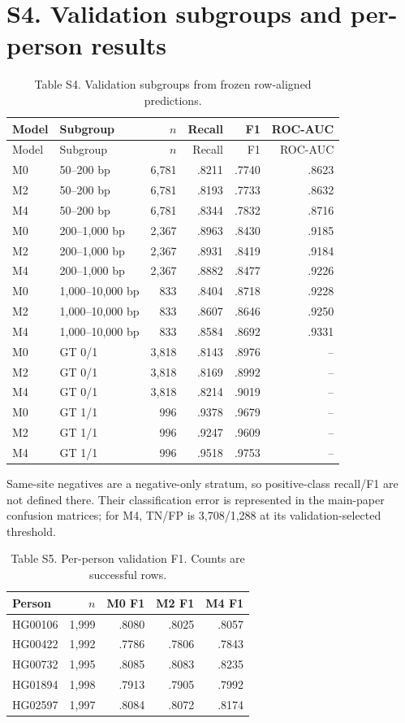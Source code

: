 \documentclass[10pt]{article}
\begin{document}
\section*{S4. Validation subgroups and per-person results}
\begin{longtable}{llrrrr}
\caption{Table S4. Validation subgroups from frozen row-aligned predictions.}\label{tab:s4subgroups}\\
\toprule Model & Subgroup & $n$ & Recall & F1 & ROC-AUC\\\midrule\endfirsthead
\toprule Model & Subgroup & $n$ & Recall & F1 & ROC-AUC\\\midrule\endhead
\bottomrule\endfoot
M0 & 50--200 bp & 6,781 & .8211 & .7740 & .8623\\
M2 & 50--200 bp & 6,781 & .8193 & .7733 & .8632\\
M4 & 50--200 bp & 6,781 & .8344 & .7832 & .8716\\
M0 & 200--1,000 bp & 2,367 & .8963 & .8430 & .9185\\
M2 & 200--1,000 bp & 2,367 & .8931 & .8419 & .9184\\
M4 & 200--1,000 bp & 2,367 & .8882 & .8477 & .9226\\
M0 & 1,000--10,000 bp & 833 & .8404 & .8718 & .9228\\
M2 & 1,000--10,000 bp & 833 & .8607 & .8646 & .9250\\
M4 & 1,000--10,000 bp & 833 & .8584 & .8692 & .9331\\
M0 & GT 0/1 & 3,818 & .8143 & .8976 & --\\
M2 & GT 0/1 & 3,818 & .8169 & .8992 & --\\
M4 & GT 0/1 & 3,818 & .8214 & .9019 & --\\
M0 & GT 1/1 & 996 & .9378 & .9679 & --\\
M2 & GT 1/1 & 996 & .9247 & .9609 & --\\
M4 & GT 1/1 & 996 & .9518 & .9753 & --\\
\end{longtable}
Same-site negatives are a negative-only stratum, so positive-class recall/F1 are not defined there. Their classification error is represented in the main-paper confusion matrices; for M4, TN/FP is 3,708/1,288 at its validation-selected threshold.

\begin{table}[t]\centering\small
\caption{Table S5. Per-person validation F1. Counts are successful rows.}\label{tab:s5people}
\begin{tabular}{lrrrr}\toprule Person & $n$ & M0 F1 & M2 F1 & M4 F1\\\midrule
HG00106 & 1,999 & .8080 & .8025 & .8057\\
HG00422 & 1,992 & .7786 & .7806 & .7843\\
HG00732 & 1,995 & .8085 & .8083 & .8235\\
HG01894 & 1,998 & .7913 & .7905 & .7992\\
HG02597 & 1,997 & .8084 & .8072 & .8174\\\bottomrule
\end{tabular}
\end{table}
\end{document}
